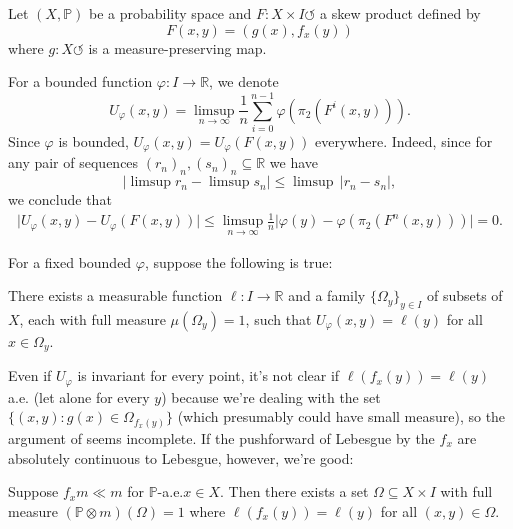 \documentclass[b5paper]{report}
\begin{document}
Let \((X,\mathbb{P})\) be a probability space and \(F \colon X \times I \circlearrowleft\) a skew product defined by
\[F(x,y) = (g(x),f_x(y))\]
where \(g \colon X \circlearrowleft\) is a measure-preserving map.

For a bounded function \(\varphi \colon I \to \mathbb{R}\), we denote
\begin{equation*}
  U_{\varphi}(x,y) = \limsup_{n \to \infty}\frac{1}{n}\sum_{i = 0}^{n - 1}\varphi(\pi_2(F^i(x,y))).
\end{equation*}
Since \(\varphi\) is bounded, \(U_{\varphi}(x,y) = U_{\varphi}(F(x,y))\) everywhere. Indeed, since for any pair of sequences \((r_n)_n,(s_n)_n \subseteq \mathbb{R}\) we have
\begin{equation*}
  \lvert \limsup r_{n} - \limsup s_n \rvert \leq \limsup\, \lvert r_n - s_n \rvert,
\end{equation*}
we conclude that
\begin{align*}
  \lvert U_{\varphi}(x,y) - U_{\varphi}(F(x,y)) \rvert \le \limsup_{n \to \infty} \frac{1}{n} \lvert \varphi(y) - \varphi(\pi_2(F^n(x,y))) \rvert = 0.
\end{align*}

For a fixed bounded \(\varphi\), suppose the following is true:
\begin{hypothesis}\label{h:1}
  There exists a measurable function \(\ell \colon I \to \mathbb{R}\) and a family \(\{\Omega_y\}_{y \in I}\) of subsets of \(X\), each with full measure \(\mu(\Omega_y) = 1\), such that \(U_{\varphi}(x,y) = \ell(y)\) for all \(x \in \Omega_y\).
\end{hypothesis}

Even if \(U_{\varphi}\) is invariant for every point, it's not clear if \(\ell(f_x(y)) = \ell(y)\) a.e. (let alone for every \(y\)) because we're dealing with the set \(\{ (x,y) : g(x) \in \Omega_{f_{x}(y)} \}\) (which presumably could have small measure), so the argument of \cite{bonifantSchwarzianDerivativesCylinder2008} seems incomplete. If the pushforward of Lebesgue by the \(f_x\) are absolutely continuous to Lebesgue, however, we're good: 

\begin{lemma}\label{l1}
  Suppose \(f_xm \ll m\) for \(\mathbb{P}\)-a.e.\@ \(x \in X\). Then there exists a set \(\Omega \subseteq X \times I\) with full measure \((\mathbb{P}\otimes m)(\Omega) = 1\) where \(\ell(f_x(y)) = \ell(y)\) for all \((x,y) \in \Omega\).
\end{lemma}
\end{document}
